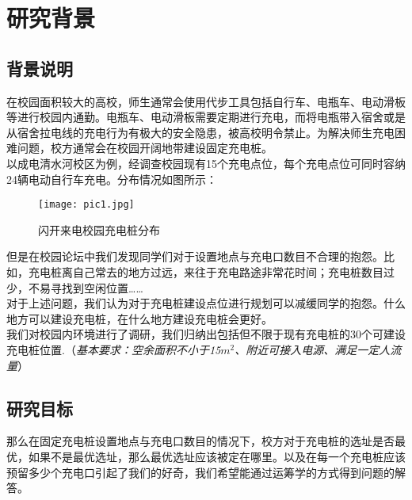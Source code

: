 \section{研究背景}
\subsection{背景说明}
在校园面积较大的高校，师生通常会使用代步工具包括自行车、电瓶车、电动滑板等进行校园内通勤。电瓶车、电动滑板需要定期进行充电，而将电瓶带入宿舍或是从宿舍拉电线的充电行为有极大的安全隐患，被高校明令禁止。为解决师生充电困难问题，校方通常会在校园开阔地带建设固定充电桩。\\
\indent 以成电清水河校区为例，经调查校园现有15个充电点位，每个充电点位可同时容纳24辆电动自行车充电。分布情况如图所示：
\begin{figure}[H]
    \centering
    \texttt{[image: pic1.jpg]}
    \caption{闪开来电校园充电桩分布}
\end{figure}
但是在校园论坛中我们发现同学们对于设置地点与充电口数目不合理的抱怨。比如，充电桩离自己常去的地方过远，来往于充电路途非常花时间；充电桩数目过少，不易寻找到空闲位置……\\
\indent 对于上述问题，我们认为对于充电桩建设点位进行规划可以减缓同学的抱怨。什么地方可以建设充电桩，在什么地方建设充电桩会更好。\\
\indent 我们对校园内环境进行了调研，我们归纳出包括但不限于现有充电桩的30个可建设充电桩位置.（\textit{基本要求：空余面积不小于15$m^2$、附近可接入电源、满足一定人流量}）
\subsection{研究目标}
那么在固定充电桩设置地点与充电口数目的情况下，校方对于充电桩的选址是否最优，如果不是最优选址，那么最优选址应该被定在哪里。以及在每一个充电桩应该预留多少个充电口引起了我们的好奇，我们希望能通过运筹学的方式得到问题的解答。






